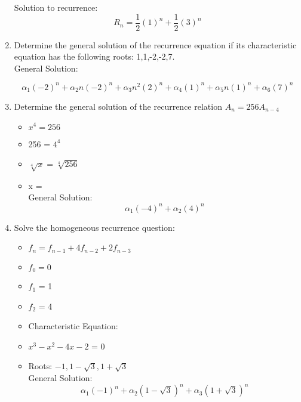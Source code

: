 \documentclass[11pt]{article}
\newcounter{prnum}
\newenvironment{problem}{{\vskip 0.2in\noindent\bf Problem
       \addtocounter{prnum}{1} \arabic{prnum}.}}{\vskip 0.1in}
\begin{document}
\begin{problem}
\begin{enumerate}[label=\alph*)]
      Solution to recurrence: 
      \begin{equation}
        R_n = \frac{1}{2} (1)^n + \frac{1}{2} (3)^n
      \end{equation}

    \item Determine the general solution of the recurrence equation if its characteristic
      equation has the following roots: 1,1,-2,-2,7.\\


        General Solution: 

      \begin{equation}
        \alpha_1(-2)^n+\alpha_2n(-2)^n+\alpha_3n^2(2)^n+\alpha_4(1)^n+\alpha_5n(1)^n+\alpha_6(7)^n
      \end{equation}
      \pagebreak

    \item Determine the general solution of the recurrence relation $A_n = 256A_{n-4}$
      \begin{itemize}
        \item $x^4 = 256$
        \item 256 = $4^4$
        \item \Rightarrow $\sqrt[4]{x} = \sqrt[4]{256}$
        \item x = \\
         General Solution: 
         \begin{equation}
         \alpha_1(-4)^n+\alpha_2(4)^n
         \end{equation}
      \end{itemize}

    \item Solve the homogeneous recurrence question:
      \begin{itemize}
      \item $f_n = f_{n-1} + 4 f_{n-2} + 2 f_{n-3}$
        \item $f_0 = 0$
        \item $f_1$ = 1
        \item $f_2$ = 4
        \item Characteristic Equation: 
        \item \Rightarrow $x^3 - x^2 - 4x - 2$ = 0 
        \item \Rightarrow Roots: $-1, 1 - \sqrt{3}, 1 + \sqrt{3}$\\

        General Solution:
          \begin{equation}
        \alpha_{1} (-1)^{n} + \alpha_{2} (1-\sqrt{3})^{n} + \alpha_{3} (1 + \sqrt{3})^n
          \end{equation}
      \end{itemize}
  \end{enumerate}
\end{problem} 
\pagebreak
\end{document}

